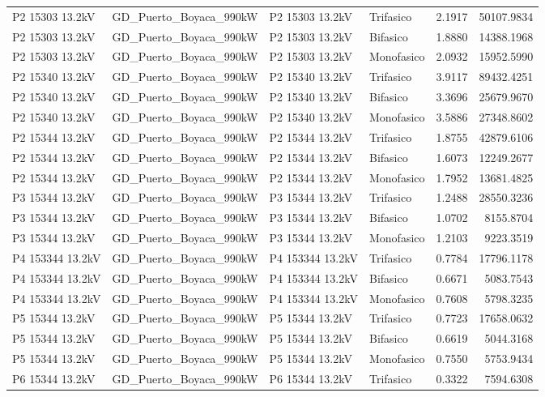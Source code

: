 \documentclass[11pt,a4paper]{article}
\begin{document}
\begin{longtable}{llllrr}
P2 15303 13.2kV & GD\_Puerto\_Boyaca\_990kW & P2 15303 13.2kV & Trifasico & 2.1917 & 50107.9834 \\
P2 15303 13.2kV & GD\_Puerto\_Boyaca\_990kW & P2 15303 13.2kV & Bifasico & 1.8880 & 14388.1968 \\
P2 15303 13.2kV & GD\_Puerto\_Boyaca\_990kW & P2 15303 13.2kV & Monofasico & 2.0932 & 15952.5990 \\
P2 15340 13.2kV & GD\_Puerto\_Boyaca\_990kW & P2 15340 13.2kV & Trifasico & 3.9117 & 89432.4251 \\
P2 15340 13.2kV & GD\_Puerto\_Boyaca\_990kW & P2 15340 13.2kV & Bifasico & 3.3696 & 25679.9670 \\
P2 15340 13.2kV & GD\_Puerto\_Boyaca\_990kW & P2 15340 13.2kV & Monofasico & 3.5886 & 27348.8602 \\
P2 15344 13.2kV & GD\_Puerto\_Boyaca\_990kW & P2 15344 13.2kV & Trifasico & 1.8755 & 42879.6106 \\
P2 15344 13.2kV & GD\_Puerto\_Boyaca\_990kW & P2 15344 13.2kV & Bifasico & 1.6073 & 12249.2677 \\
P2 15344 13.2kV & GD\_Puerto\_Boyaca\_990kW & P2 15344 13.2kV & Monofasico & 1.7952 & 13681.4825 \\
P3 15344 13.2kV & GD\_Puerto\_Boyaca\_990kW & P3 15344 13.2kV & Trifasico & 1.2488 & 28550.3236 \\
P3 15344 13.2kV & GD\_Puerto\_Boyaca\_990kW & P3 15344 13.2kV & Bifasico & 1.0702 & 8155.8704 \\
P3 15344 13.2kV & GD\_Puerto\_Boyaca\_990kW & P3 15344 13.2kV & Monofasico & 1.2103 & 9223.3519 \\
P4 153344 13.2kV & GD\_Puerto\_Boyaca\_990kW & P4 153344 13.2kV & Trifasico & 0.7784 & 17796.1178 \\
P4 153344 13.2kV & GD\_Puerto\_Boyaca\_990kW & P4 153344 13.2kV & Bifasico & 0.6671 & 5083.7543 \\
P4 153344 13.2kV & GD\_Puerto\_Boyaca\_990kW & P4 153344 13.2kV & Monofasico & 0.7608 & 5798.3235 \\
P5 15344 13.2kV & GD\_Puerto\_Boyaca\_990kW & P5 15344 13.2kV & Trifasico & 0.7723 & 17658.0632 \\
P5 15344 13.2kV & GD\_Puerto\_Boyaca\_990kW & P5 15344 13.2kV & Bifasico & 0.6619 & 5044.3168 \\
P5 15344 13.2kV & GD\_Puerto\_Boyaca\_990kW & P5 15344 13.2kV & Monofasico & 0.7550 & 5753.9434 \\
P6 15344 13.2kV & GD\_Puerto\_Boyaca\_990kW & P6 15344 13.2kV & Trifasico & 0.3322 & 7594.6308 \\

\end{longtable}
\end{document}
